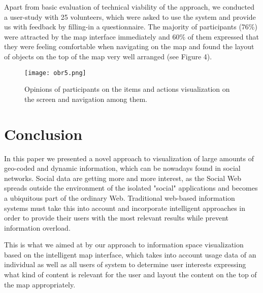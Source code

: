 \documentclass{llncs}
\begin{document}
Apart from basic evaluation of technical viability of the approach, we conducted a user-study with 25 volunteers, which were asked to use the system and provide us with feedback by filling-in a questionnaire. The majority of participants (76\%) were attracted by the map interface immediately and 60\% of them expressed that they were feeling comfortable when navigating on the map and found the layout of objects on the top of the map very well arranged (see Figure 4).

\begin{figure}
\centering
\texttt{[image: obr5.png]}
\caption{Opinions of participants on the items and actions visualization on the screen and navigation among them.}
\end{figure}

\section{Conclusion}
In this paper we presented a novel approach to visualization of large amounts of geo-coded and dynamic information, which can be nowadays found in social networks. Social data are getting more and more interest, as the Social Web spreads outside the environment of the isolated "social" applications and becomes a ubiquitous part of the ordinary Web. Traditional web-based information systems must take this into account and incorporate intelligent approaches in order to provide their users with the most relevant results while prevent information overload.

This is what we aimed at by our approach to information space visualization based on the intelligent map interface, which takes into account usage data of an individual as well as all users of system to determine user interests expressing what kind of content is relevant for the user and layout the content on the top of the map appropriately.
\end{document}
